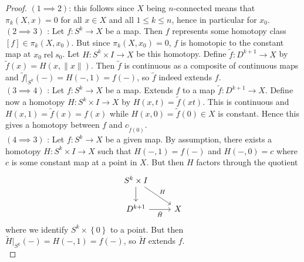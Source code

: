 \documentclass[reqno]{amsart}
\theoremstyle{definition}
\theoremstyle{remark}
\DeclareMathOperator{\rel}{rel}
\begin{document}
    \begin{proof}
        $\left( 1 \implies 2 \right) $: this follows since
        $X$ being $n$-connected means that $\pi_k\left( X,x \right) 
        = 0$ for all $x \in X$ and all $1\le k\le n$,
        hence in particular for $x_0$.\\
        $(2 \implies 3)$ : Let
        $f \colon S^{k} \to X$ be a map. 
        Then $f$ represents some homotopy class
        $\left[ f \right] \in \pi_k\left( X,x_0 \right) $. But
        since $\pi_k(X,x_0) = 0$, $f$ is homotopic to
        the constant map at $x_0 \rel s_0$.
        Let $H \colon S^{k} \times I \to X$ be this homotopy.
        Define
        $\tilde{f} \colon D^{k+1} \to X$ by
        $\tilde{f}(x) = H \left( x, \|x\| \right) $.
        Then $\tilde{f}$ is continuous as a composite of
        continuous maps and
        $\tilde{f}|_{S^{k}}(-) = 
        H\left( - , 1 \right) =
        f(-)$, so $\tilde{f}$ indeed extends $f$.\\
        $(3 \implies 4)$ : Let $f \colon S^{k} \to X$ be
        a map. Extends $f$ to a map
        $\tilde{f} \colon D^{k+1} \to X$. Define now
        a homotopy
        $H \colon S^{k} \times I \to X$ by
        $H\left( x,t \right) =
        \tilde{f}\left( xt \right) $. This is continuous
        and $H\left( x,1 \right) =
        \tilde{f}(x) = f(x)$ while
        $H\left( x,0 \right) = 
        \tilde{f}(0) \in X$ is constant. Hence this gives
        a homotopy between $f$ and $c_{\tilde{f}(0)}$.\\
        \linebreak
        $(4 \implies 3)$ : 
        Let $f \colon S^{k} \to X$ be a given map.
        By assumption, there exists
        a homotopy
        $H \colon S^{k} \times I \to X$ such that
        $H\left( -,1 \right) = f(-)$ and
        $H(-,0) = c$ where $c$ is some constant map
        at a point in $X$.
        But then $H$ factors through the quotient
        \begin{equation*}
        \begin{tikzcd}
            S^{k} \times I \ar[d] \ar[dr, "H"] & \\
            D^{k+1} \ar[r, "\tilde{H}"'] & X
        \end{tikzcd}
        \end{equation*}
        where we identify
        $S^{k} \times \left\{ 0 \right\} $ to a point.
        But then $\tilde{H}|_{S^{k}} (-) = 
        H\left( -, 1 \right) =
        f(-)$, so $\tilde{H}$ extends $f$.\\

\end{proof}
\end{document}
